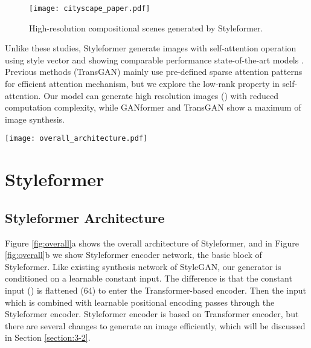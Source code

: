 \documentclass[10pt,twocolumn,letterpaper]{article}
\begin{document}
\begin{figure}[t]
\begin{center}

\texttt{[image: cityscape\_paper.pdf]}

\end{center}
\vspace{-5mm}
   \caption{High-resolution compositional scenes generated by Styleformer.
}
\label{fig:afhq}
\end{figure}

Unlike these studies, Styleformer generate images with self-attention operation using style vector and showing comparable performance state-of-the-art models \cite{karras2019stylebased,karras2020analyzing}. Previous methods (TransGAN) mainly use pre-defined sparse attention patterns for efficient attention mechanism, but we explore the low-rank property in self-attention. Our model can generate high resolution images () with reduced computation complexity, while GANformer and TransGAN show a maximum of  image synthesis.



\begin{figure*}[t]
\begin{center}

\texttt{[image: overall\_architecture.pdf]}


\end{center}
\vspace{-5mm}
   \caption{(a) Overall Architecture of Styleformer. (b) Styleformer encoder structure, which is the basic block of Styleformer.
}
\vspace{-3mm}
\label{fig:overall}
\end{figure*}




\section{Styleformer}
\label{sec:3}







\subsection{Styleformer Architecture}
\label{section:3-1}

Figure \ref{fig:overall}a shows the overall architecture of Styleformer, and in Figure \ref{fig:overall}b we show Styleformer encoder network, the basic block of Styleformer. Like existing synthesis network of StyleGAN, our generator is conditioned on a learnable constant input. The difference is that the constant input () is flattened (64) to enter the Transformer-based encoder. Then the input which is combined with learnable positional encoding passes through the Styleformer encoder. Styleformer encoder is based on Transformer encoder, but there are several changes to generate an image efficiently, which will be discussed in Section \ref{section:3-2}.  
\end{document}
